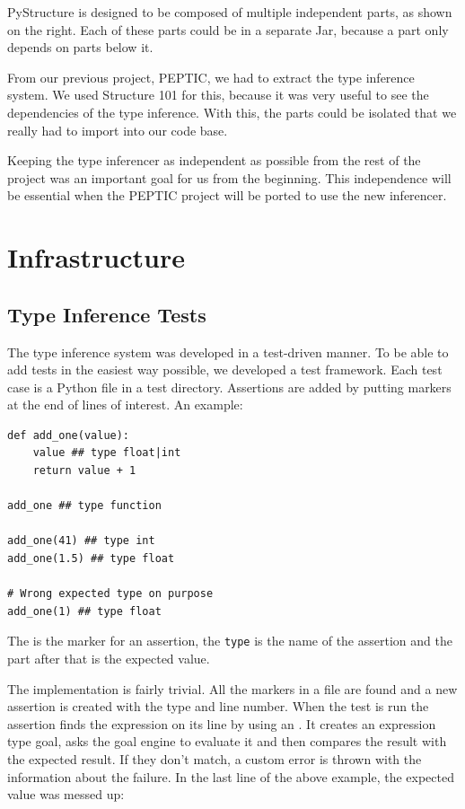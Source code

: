 \documentclass[12pt,halfparskip,DIV11,BCOR10mm]{scrreprt}
\begin{document}
PyStructure is designed to be composed of multiple independent parts, as shown on the right. Each of these parts could be in a separate Jar, because a part only depends on parts below it.

From our previous project, PEPTIC, we had to extract the type inference system. We used Structure 101 for this, because it was very useful to see the dependencies of the type inference. With this, the parts could be isolated that we really had to import into our code base.

Keeping the type inferencer as independent as possible from the rest of the project was an important goal for us from the beginning. This independence will be essential when the PEPTIC project will be ported to use the new inferencer.

\section{Infrastructure}

\subsection{Type Inference Tests}

The type inference system was developed in a test-driven manner. To be able to add tests in the easiest way possible, we developed a test framework. Each test case is a Python file in a test directory. Assertions are added by putting markers at the end of lines of interest. An example:

\begin{lstlisting}
def add_one(value):
    value ## type float|int
    return value + 1

add_one ## type function

add_one(41) ## type int
add_one(1.5) ## type float

# Wrong expected type on purpose
add_one(1) ## type float
\end{lstlisting}

The \code{##} is the marker for an assertion, the \texttt{type} is the name of the assertion and the part after that is the expected value.

The implementation is fairly trivial. All the markers in a file are found and a new assertion is created with the type and line number. When the test is run the assertion finds the expression on its line by using an . It creates an expression type goal, asks the goal engine to evaluate it and then compares the result with the expected result. If they don't match, a custom error  is thrown with the information about the failure. In the last line of the above example, the expected value was messed up:
\end{document}
